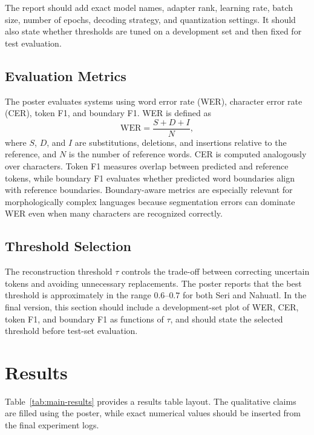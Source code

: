 \documentclass[11pt]{article}
\newcommand{\wer}{\mathrm{WER}}
\begin{document}
The report should add exact model names, adapter rank, learning rate, batch size, number of epochs, decoding strategy, and quantization settings. It should also state whether thresholds are tuned on a development set and then fixed for test evaluation.

\subsection{Evaluation Metrics}

The poster evaluates systems using word error rate (WER), character error rate (CER), token F1, and boundary F1. WER is defined as
\begin{equation}
    \wer = \frac{S + D + I}{N},
\end{equation}
where $S$, $D$, and $I$ are substitutions, deletions, and insertions relative to the reference, and $N$ is the number of reference words. CER is computed analogously over characters. Token F1 measures overlap between predicted and reference tokens, while boundary F1 evaluates whether predicted word boundaries align with reference boundaries. Boundary-aware metrics are especially relevant for morphologically complex languages because segmentation errors can dominate WER even when many characters are recognized correctly.

\subsection{Threshold Selection}

The reconstruction threshold $\tau$ controls the trade-off between correcting uncertain tokens and avoiding unnecessary replacements. The poster reports that the best threshold is approximately in the range $0.6$--$0.7$ for both Seri and Nahuatl. In the final version, this section should include a development-set plot of WER, CER, token F1, and boundary F1 as functions of $\tau$, and should state the selected threshold before test-set evaluation.

\section{Results}

Table~\ref{tab:main-results} provides a results table layout. The qualitative claims are filled using the poster, while exact numerical values should be inserted from the final experiment logs.
\end{document}
